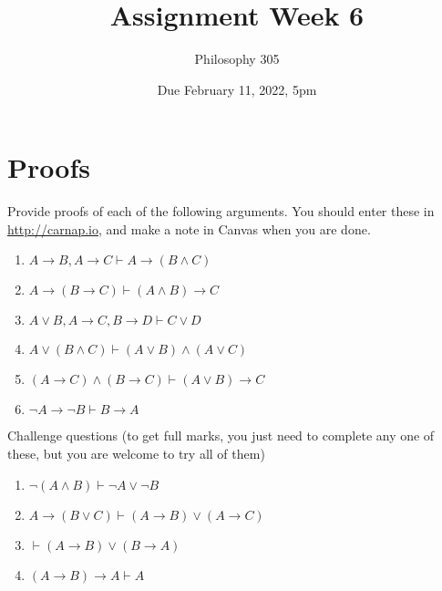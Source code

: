 \documentclass[
  11pt,
]{article}
\title{Assignment Week 6}
\author{Philosophy 305}
\date{Due February 11, 2022, 5pm}
\providecommand{\tightlist}{%
  \setlength{\itemsep}{0pt}\setlength{\parskip}{0pt}}
\begin{document}
\maketitle

\hypertarget{proofs}{%
\section{Proofs}\label{proofs}}

Provide proofs of each of the following arguments. You should enter
these in \url{http://carnap.io}, and make a note in Canvas when you are
done.

\begin{enumerate}
\def\labelenumi{\arabic{enumi}.}
\tightlist
\item
  \(A \rightarrow B, A \rightarrow C \vdash A \rightarrow (B \wedge C)\)
\item
  \(A \rightarrow (B \rightarrow C) \vdash (A \wedge B) \rightarrow C\)
\item
  \(A \vee B, A \rightarrow C, B \rightarrow D \vdash C \vee D\)
\item
  \(A \vee (B \wedge C) \vdash (A \vee B) \wedge (A \vee C)\)
\item
  \((A \rightarrow C) \wedge (B \rightarrow C) \vdash (A \vee B) \rightarrow C\)
\item
  \(\neg A \rightarrow \neg B \vdash B \rightarrow A\)
\end{enumerate}

Challenge questions (to get full marks, you just need to complete any
one of these, but you are welcome to try all of them)

\begin{enumerate}
\def\labelenumi{\arabic{enumi}.}
\setcounter{enumi}{6}
\tightlist
\item
  \(\neg (A \wedge B) \vdash \neg A \vee \neg B\)
\item
  \(A \rightarrow (B \vee C) \vdash (A \rightarrow B) \vee (A \rightarrow C)\)
\item
  \(\vdash (A \rightarrow B) \vee (B \rightarrow A)\)
\item
  \((A \rightarrow B) \rightarrow A \vdash A\)
\end{enumerate}
\end{document}
